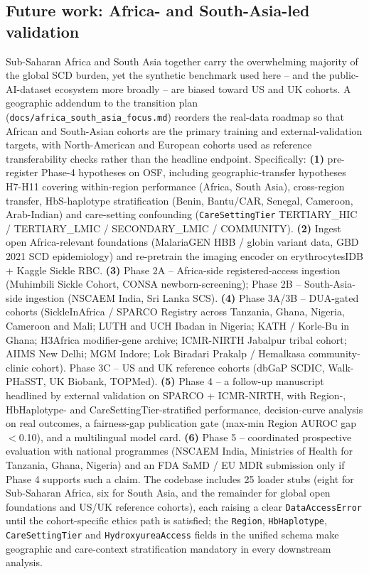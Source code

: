 \documentclass[11pt,a4paper]{article}
\begin{document}
\subsection{Future work: Africa- and South-Asia-led validation}
Sub-Saharan Africa and South Asia together carry the overwhelming majority of the global SCD burden, yet the synthetic benchmark used here -- and the public-AI-dataset ecosystem more broadly -- are biased toward US and UK cohorts. A geographic addendum to the transition plan (\texttt{docs/africa\_south\_asia\_focus.md}) reorders the real-data roadmap so that African and South-Asian cohorts are the primary training and external-validation targets, with North-American and European cohorts used as reference transferability checks rather than the headline endpoint. Specifically: \textbf{(1)} pre-register Phase-4 hypotheses on OSF, including geographic-transfer hypotheses H7-H11 covering within-region performance (Africa, South Asia), cross-region transfer, HbS-haplotype stratification (Benin, Bantu/CAR, Senegal, Cameroon, Arab-Indian) and care-setting confounding (\texttt{CareSettingTier} TERTIARY\_HIC / TERTIARY\_LMIC / SECONDARY\_LMIC / COMMUNITY). \textbf{(2)} Ingest open Africa-relevant foundations (MalariaGEN HBB / globin variant data, GBD 2021 SCD epidemiology) and re-pretrain the imaging encoder on erythrocytesIDB + Kaggle Sickle RBC. \textbf{(3)} Phase 2A -- Africa-side registered-access ingestion (Muhimbili Sickle Cohort, CONSA newborn-screening); Phase 2B -- South-Asia-side ingestion (NSCAEM India, Sri Lanka SCS). \textbf{(4)} Phase 3A/3B -- DUA-gated cohorts (SickleInAfrica / SPARCO Registry across Tanzania, Ghana, Nigeria, Cameroon and Mali; LUTH and UCH Ibadan in Nigeria; KATH / Korle-Bu in Ghana; H3Africa modifier-gene archive; ICMR-NIRTH Jabalpur tribal cohort; AIIMS New Delhi; MGM Indore; Lok Biradari Prakalp / Hemalkasa community-clinic cohort). Phase 3C -- US and UK reference cohorts (dbGaP SCDIC, Walk-PHaSST, UK Biobank, TOPMed). \textbf{(5)} Phase 4 -- a follow-up manuscript headlined by external validation on SPARCO + ICMR-NIRTH, with Region-, HbHaplotype- and CareSettingTier-stratified performance, decision-curve analysis on real outcomes, a fairness-gap publication gate (max-min Region AUROC gap $<$0.10), and a multilingual model card. \textbf{(6)} Phase 5 -- coordinated prospective evaluation with national programmes (NSCAEM India, Ministries of Health for Tanzania, Ghana, Nigeria) and an FDA SaMD / EU MDR submission only if Phase 4 supports such a claim. The codebase includes 25 loader stubs (eight for Sub-Saharan Africa, six for South Asia, and the remainder for global open foundations and US/UK reference cohorts), each raising a clear \texttt{DataAccessError} until the cohort-specific ethics path is satisfied; the \texttt{Region}, \texttt{HbHaplotype}, \texttt{CareSettingTier} and \texttt{HydroxyureaAccess} fields in the unified schema make geographic and care-context stratification mandatory in every downstream analysis.
\FloatBarrier
\end{document}
